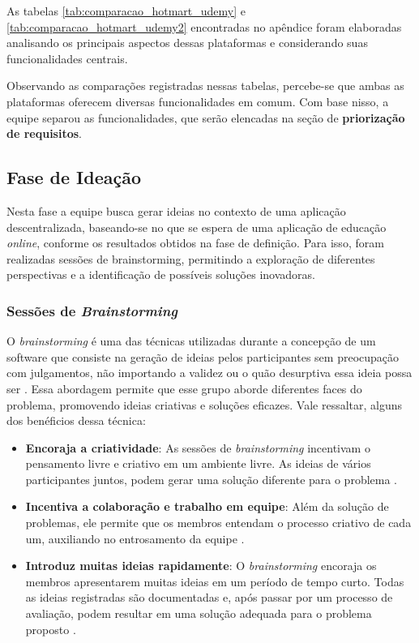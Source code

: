         As tabelas \ref{tab:comparacao_hotmart_udemy} e \ref{tab:comparacao_hotmart_udemy2} encontradas no apêndice foram elaboradas analisando os principais aspectos dessas plataformas e considerando suas funcionalidades centrais.

        Observando as comparações registradas nessas tabelas, percebe-se que ambas as plataformas oferecem diversas funcionalidades em comum. Com base nisso, a equipe separou as funcionalidades, que serão elencadas na seção de \textbf{priorização de requisitos}.

    \subsection{Fase de Ideação}
    Nesta fase a equipe busca gerar ideias no contexto de uma aplicação descentralizada, baseando-se no que se espera de uma aplicação de educação \textit{online}, conforme os resultados obtidos na fase de definição. Para isso, foram realizadas sessões de brainstorming, permitindo a exploração de diferentes perspectivas e a identificação de possíveis soluções inovadoras.

        \subsubsection{Sessões de \textit{Brainstorming}}
        \label{brainstorming}
        O \textit{brainstorming} é uma das técnicas utilizadas durante a concepção de um software que consiste na geração de ideias pelos participantes sem preocupação com julgamentos, não importando a validez ou o quão desurptiva essa ideia possa ser \cite{osborn1953}. Essa abordagem permite que esse grupo aborde diferentes faces do problema, promovendo ideias criativas e soluções eficazes. Vale ressaltar, alguns dos benéficios dessa técnica:

        \begin{itemize}
            \item \textbf{Encoraja a criatividade}: As sessões de \textit{brainstorming} incentivam o pensamento livre e criativo em um ambiente livre. As ideias de vários participantes juntos, podem gerar uma solução diferente para o problema \cite{miro2025}.
            \item \textbf{Incentiva a colaboração e trabalho em equipe}: Além da solução de problemas, ele permite que os membros entendam o processo criativo de cada um, auxiliando no entrosamento da equipe \cite{miro2025}.
            \item \textbf{Introduz muitas ideias rapidamente}: O \textit{brainstorming} encoraja os membros apresentarem muitas ideias em um período de tempo curto. Todas as ideias registradas são documentadas e, após passar por um processo de avaliação, podem resultar em uma solução adequada para o problema proposto \cite{miro2025}.
        \end{itemize}

